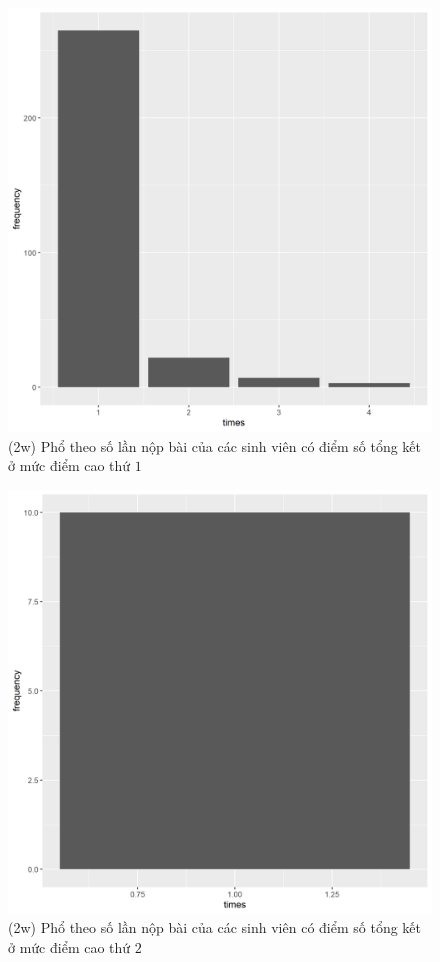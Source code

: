 \documentclass[a4paper]{article}
\theoremstyle{definition}
\begin{document}
\newpage
\begin{figure}[!ht]
    \centering
    \includegraphics[scale=0.4]{Pics/q2w-1-file4.png}
    \caption{(2w) Phổ theo số lần nộp bài của các sinh viên có điểm số tổng kết ở mức điểm cao thứ $1$}
    \label{fig:my_label}
\end{figure}
\begin{figure}[!ht]
    \centering
    \includegraphics[scale=0.4]{Pics/q2w-2-file4.png}
    \caption{(2w) Phổ theo số lần nộp bài của các sinh viên có điểm số tổng kết ở mức điểm cao thứ $2$}
    \label{fig:my_label}
\end{figure}
\end{document}
